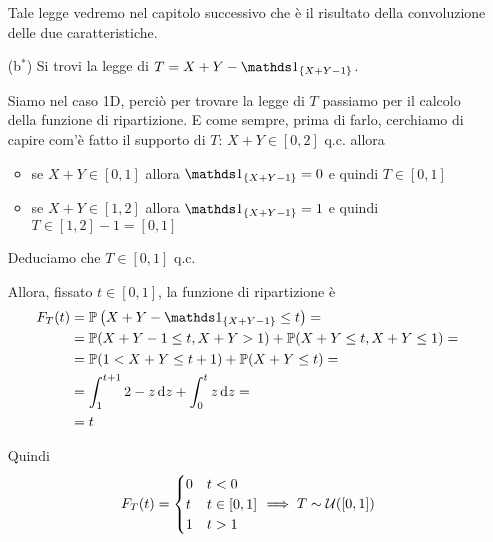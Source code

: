 \begin{enumerate}

\begin{rem} Tale legge vedremo nel capitolo successivo che è il risultato della convoluzione delle due caratteristiche. \end{rem}

\item [(b$^*$)] Si trovi la legge di $T=X+Y-\Ind_{\{ X+Y-1 \}}$.

Siamo nel caso 1D, perciò per trovare la legge di $T$ passiamo per il calcolo della funzione di ripartizione. E come sempre, prima di farlo, cerchiamo di capire com'è fatto il supporto di $T$: $X+Y\in[0,2]$ q.c. allora
\begin{itemize}
\item se $X+Y\in[0,1]$ allora $\Ind_{\{ X+Y-1 \}}=0$ e quindi $T\in[0,1]$
\item se $X+Y\in[1,2]$ allora $\Ind_{\{ X+Y-1 \}}=1$ e quindi $T\in[1,2]-1=[0,1]$
\end{itemize}
Deduciamo che $T\in[0,1]$ q.c.

Allora, fissato $t\in[0,1]$, la funzione di ripartizione è
\begin{gather*}
\begin{aligned}
F_T(t)&=\PP\left(X+Y-\Ind_{\{ X+Y-1 \}}\leq t  \right)=\\
&=\PP(X+Y-1\leq t,X+Y>1)+\PP(X+Y\leq t,X+Y\leq 1)=\\
&=\PP(1<X+Y\leq t+1)+\PP(X+Y\leq t)=\\
&=\int_1^{t+1}2-z\dz+\int_0^tz\dz=\\
&=t
\end{aligned}
\end{gather*}

Quindi
\[
F_T(t)=
\begin{cases}
0 &t<0 \\
t &t\in[0,1] \\
1 &t>1
\end{cases}
\implies T\sim\mathcal{U}([0,1])
\]

\end{enumerate}

